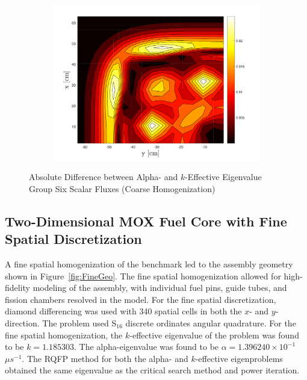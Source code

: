 \begin{figure}[!htbp]
\centering
\begin{subfigure}{\textwidth}
  \centering
  \includegraphics[width=.7\linewidth]{Figures/HigherDimEigen/Alpha_g6_k_g6_AbsDiff}
\end{subfigure}
\caption{Absolute Difference between Alpha- and $k$-Effective Eigenvalue Group Six Scalar Fluxes (Coarse Homogenization)}
\label{fig:EigScalarFluxDiff}
\end{figure}

\clearpage
\subsection{Two-Dimensional MOX Fuel Core with Fine Spatial Discretization}

A fine spatial homogenization of the benchmark led to the assembly geometry shown in Figure~\ref{fig:FineGeo}. The fine spatial homogenization allowed for high-fidelity modeling of the assembly, with individual fuel pins, guide tubes, and fission chambers resolved in the model. For the fine spatial discretization, diamond differencing was used with 340 spatial cells in both the $x$- and $y$-direction. The problem used S$_{16}$ discrete ordinates angular quadrature. For the fine spatial homogenization, the $k$-effective eigenvalue of the problem was found to be $k = 1.185303$. The alpha-eigenvalue was found to be $\alpha = 1.396240 \times 10^{-1}$ $\mu s^{-1}$. The RQFP method for both the alpha- and $k$-effective eigenproblems obtained the same eigenvalue as the critical search method and power iteration. 


